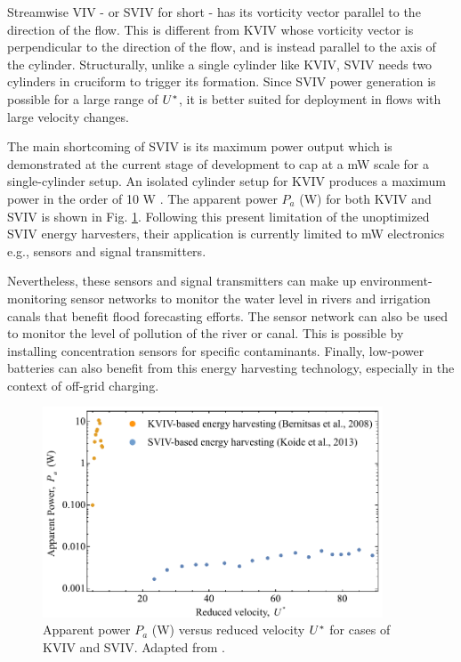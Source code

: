 \documentclass[oneside]{utmthesis}
\begin{document}
Streamwise VIV - or SVIV for short - has its vorticity vector parallel to the direction of the flow. This is different from KVIV whose vorticity vector is perpendicular to the direction of the flow, and is instead parallel to the axis of the cylinder. Structurally, unlike a single cylinder like KVIV, SVIV needs two cylinders in cruciform to trigger its formation. Since SVIV power generation is possible for a large range of $U^{*}$, it is better suited for deployment in flows with large velocity changes.

The main shortcoming of SVIV is its maximum power output which is demonstrated at the current stage of development to cap at a mW scale for a single-cylinder setup. An isolated cylinder setup for KVIV produces a maximum power in the order of 10 W \citep{Bernitsas2009}. The apparent power $P_a$ (W) for both KVIV and SVIV is shown in Fig. \ref{fig:apparentPowerKoide}. Following this present limitation of the unoptimized SVIV energy harvesters, their application is currently limited to mW electronics e.g., sensors and signal transmitters.

Nevertheless, these sensors and signal transmitters can make up environment-monitoring sensor networks to monitor the water level in rivers and irrigation canals that benefit flood forecasting efforts. The sensor network can also be used to monitor the level of pollution of the river or canal. This is possible by installing concentration sensors for specific contaminants. Finally, low-power batteries can also benefit from this energy harvesting technology, especially in the context of off-grid charging.

\begin{figure}[!h]
  \centering
  \includegraphics[width=0.9\textwidth]{figs/apparentPowerKoide}
  \caption{Apparent power $P_a $ (W) versus reduced velocity $U^{*}$ for cases of KVIV and SVIV. Adapted from \citet{Koide2013}.}
  \label{fig:apparentPowerKoide}
\end{figure}
\end{document}
